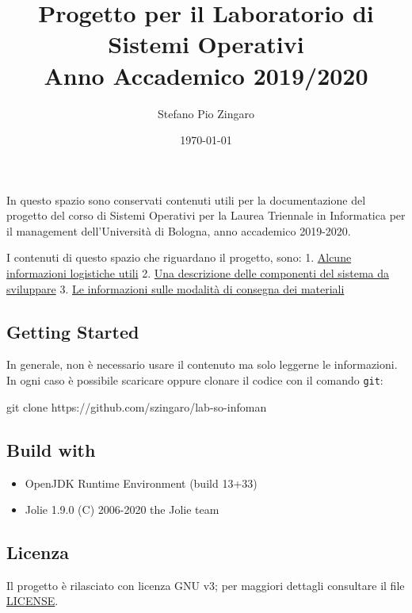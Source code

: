 \documentclass[
]{article}
\title{Progetto per il Laboratorio di Sistemi Operativi \\ Anno Accademico 2019/2020}
\author{Stefano Pio Zingaro}
\date{\today}
\newenvironment{Shaded}{}{}
\newcommand{\FunctionTok}[1]{\textcolor[rgb]{0.02,0.16,0.49}{#1}}
\newcommand{\NormalTok}[1]{#1}
\providecommand{\tightlist}{%
  \setlength{\itemsep}{0pt}\setlength{\parskip}{0pt}}
\begin{document}
\maketitle 

In questo spazio sono conservati contenuti utili per la documentazione
del progetto del corso di Sistemi Operativi per la Laurea Triennale in
Informatica per il management dell'Università di Bologna, anno
accademico 2019-2020.

I contenuti di questo spazio che riguardano il progetto, sono: 1.
\href{docs/logistica.md}{Alcune informazioni logistiche utili} 2.
\href{docs/progetto.md}{Una descrizione delle componenti del sistema da
sviluppare} 3. \href{docs/consegna.md}{Le informazioni sulle modalità di
consegna dei materiali}

\hypertarget{getting-started}{%
\subsection{Getting Started}\label{getting-started}}

In generale, non è necessario usare il contenuto ma solo leggerne le
informazioni. In ogni caso è possibile scaricare oppure clonare il
codice con il comando \texttt{git}:

\begin{Shaded}
\begin{Highlighting}[]
\FunctionTok{git}\NormalTok{ clone https://github.com/szingaro/lab{-}so{-}infoman}
\end{Highlighting}
\end{Shaded}

\hypertarget{build-with}{%
\subsection{Build with}\label{build-with}}

\begin{itemize}
\tightlist
\item
  OpenJDK Runtime Environment (build 13+33)
\item
  Jolie 1.9.0 (C) 2006-2020 the Jolie team
\end{itemize}

\hypertarget{licenza}{%
\subsection{Licenza}\label{licenza}}

Il progetto è rilasciato con licenza GNU v3; per maggiori dettagli
consultare il file \url{LICENSE}.
\end{document}
